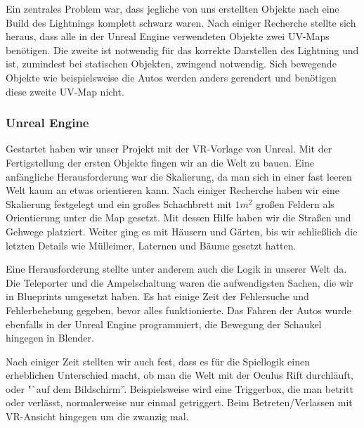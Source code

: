 \documentclass{Bericht}
\begin{document}
			Ein zentrales Problem war, dass jegliche von uns erstellten Objekte nach eine Build des Lightnings komplett schwarz waren. Nach einiger Recherche stellte sich heraus, dass alle in der Unreal Engine verwendeten Objekte zwei UV-Maps benötigen. Die zweite ist notwendig für das korrekte Darstellen des Lightning und ist, zumindest bei statischen Objekten, zwingend notwendig. Sich bewegende Objekte wie beispielsweise die Autos werden anders gerendert und benötigen diese zweite UV-Map nicht. 
		
		\subsubsection{Unreal Engine}
			Gestartet haben wir unser Projekt mit der VR-Vorlage von Unreal. Mit der Fertigstellung der ersten Objekte fingen wir an die Welt zu bauen. Eine anfängliche Herausforderung war die Skalierung, da man sich in einer fast leeren Welt kaum an etwas orientieren kann. Nach einiger Recherche haben wir eine Skalierung festgelegt und ein großes Schachbrett mit $1m^{2}$ großen Feldern als Orientierung unter die Map gesetzt. Mit dessen Hilfe haben wir die Straßen und Gehwege platziert. Weiter ging es mit Häusern und Gärten, bis wir schließlich die letzten Details wie Mülleimer, Laternen und Bäume gesetzt hatten. 
			
			Eine Herausforderung stellte unter anderem auch die Logik in unserer Welt da. Die Teleporter und die Ampelschaltung waren die aufwendigsten Sachen, die wir in Blueprints umgesetzt haben. Es hat einige Zeit der Fehlersuche und Fehlerbehebung gegeben, bevor alles funktionierte. Das Fahren der Autos wurde ebenfalls in der Unreal Engine programmiert, die Bewegung der Schaukel hingegen in Blender.
			
			Nach einiger Zeit stellten wir auch fest, dass es für die Spiellogik einen erheblichen Unterschied macht, ob man die Welt mit der Oculus Rift durchläuft, oder "`auf dem Bildschirm''. Beispielsweise wird eine Triggerbox, die man betritt oder verlässt, normalerweise nur einmal getriggert. Beim Betreten/Verlassen mit VR-Ansicht hingegen um die zwanzig mal.
			
\end{document}
